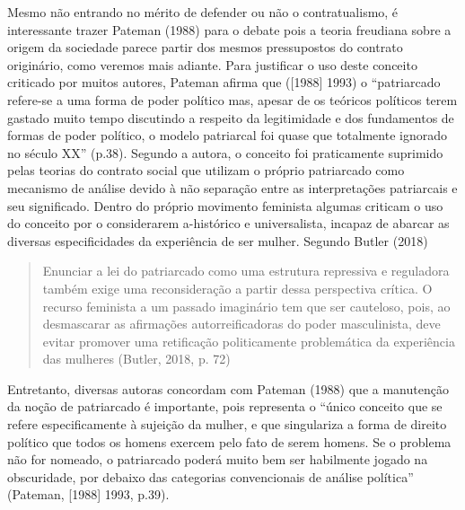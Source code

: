 Mesmo não entrando no mérito de defender ou não o contratualismo, é
interessante trazer Pateman (1988) para o debate pois a teoria freudiana
sobre a origem da sociedade parece partir dos mesmos pressupostos do
contrato originário, como veremos mais adiante. Para justificar o uso
deste conceito criticado por muitos autores, Pateman afirma que
({[}1988{]} 1993) o ``patriarcado refere-se a uma forma de poder político
mas, apesar de os teóricos políticos terem gastado muito tempo
discutindo a respeito da legitimidade e dos fundamentos de formas de
poder político, o modelo patriarcal foi quase que totalmente ignorado no
século XX'' (p.38). Segundo a autora, o conceito foi praticamente
suprimido pelas teorias do contrato social que utilizam o próprio
patriarcado como mecanismo de análise devido à não separação entre as
interpretações patriarcais e seu significado. Dentro do próprio
movimento feminista algumas criticam o uso do conceito por o
considerarem a-histórico e universalista, incapaz de abarcar as diversas
especificidades da experiência de ser mulher. Segundo Butler (2018)

\begin{quote}
Enunciar a lei do patriarcado como uma estrutura repressiva e reguladora
também exige uma reconsideração a partir dessa perspectiva crítica. O
recurso feminista a um passado imaginário tem que ser cauteloso, pois,
ao desmascarar as afirmações autorreificadoras do poder masculinista,
deve evitar promover uma retificação politicamente problemática da
experiência das mulheres (Butler, 2018, p. 72)
\end{quote}

Entretanto, diversas autoras concordam com Pateman (1988) que a
manutenção da noção de patriarcado é importante, pois representa o
``único conceito que se refere especificamente à sujeição da mulher, e
 que singulariza a forma de direito político que todos os homens exercem
 pelo fato de serem homens. Se o problema não for nomeado, o patriarcado
 poderá muito bem ser habilmente jogado na obscuridade, por debaixo das
 categorias convencionais de análise política'' (Pateman, {[}1988{]} 1993,
p.39).

